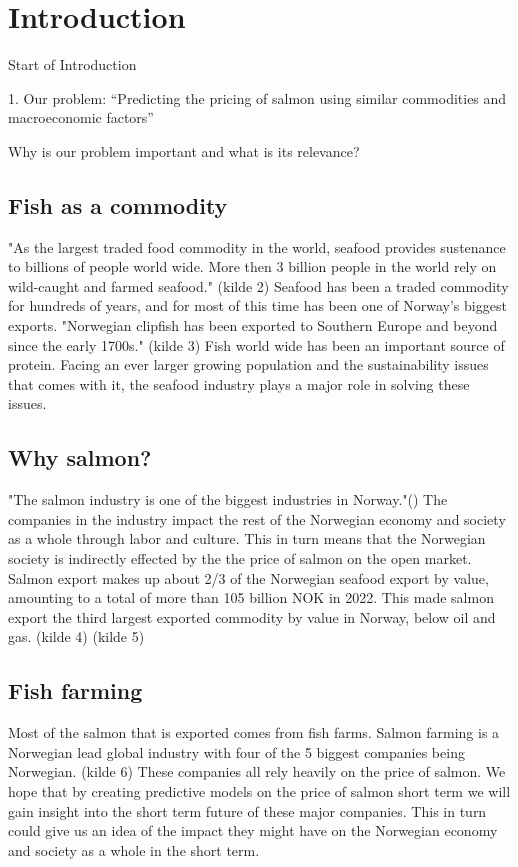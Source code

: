 \section{Introduction}
Start of Introduction

1. Our problem: “Predicting the pricing of salmon using similar commodities and macroeconomic factors” 
 
Why is our problem important and what is its relevance? 

\subsection{Fish as a commodity}
"As the largest traded food commodity in the world, seafood provides sustenance to billions of people world wide. More then 3 billion people in the world rely on wild-caught and farmed seafood." (kilde 2) Seafood has been a traded commodity for hundreds of years, and for most of this time has been one of Norway's biggest exports. "Norwegian clipfish has been exported to Southern Europe and beyond since the early 1700s." (kilde 3) Fish world wide has been an important source of protein. Facing an ever larger growing population and the sustainability issues that comes with it, the seafood industry plays a major role in solving these issues.

\subsection{Why salmon?}
"The salmon industry is one of the biggest industries in Norway."(\cite{Johansen_et_al_2019}) The companies in the industry impact the rest of the Norwegian economy and society as a whole through labor and culture. This in turn means that the Norwegian society is indirectly effected by the the price of salmon on the open market. Salmon export makes up about 2/3 of the Norwegian seafood export by value, amounting to a total of more than 105 billion NOK in 2022. This made salmon export the third largest exported commodity by value in Norway, below oil and gas. (kilde 4) (kilde 5)

\subsection{Fish farming}
Most of the salmon that is exported comes from fish farms. Salmon farming is a Norwegian lead global industry with four of the 5 biggest companies being Norwegian. (kilde 6) These companies all rely heavily on the price of salmon. We hope that by creating predictive models on the price of salmon short term we will gain insight into the short term future of these major companies. This in turn could give us an idea of the impact they might have on the Norwegian economy and society as a whole in the short term.

